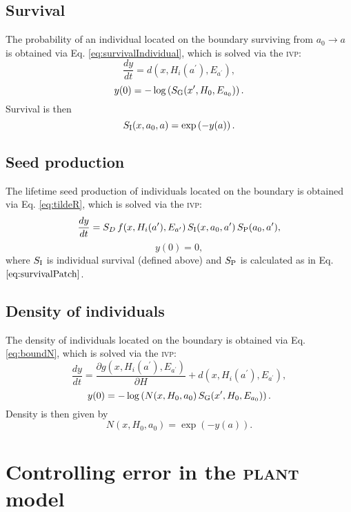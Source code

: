 \documentclass[10pt,twoside]{article}
\newcommand{\plant}{\textsc{plant}}
\begin{document}
\subsection{Survival}\label{survival}

The probability of an individual located on the boundary surviving from
\(a_0 \rightarrow a\) is obtained via Eq. \ref{eq:survivalIndividual},
which is solved via the \textsc{ivp}:
\[\frac{dy}{dt} = d(x, H_i(a^\prime) , E_{a^\prime}),\]
\[ y(0) = - \log\left(S_{\rm G} (x^\prime, H_0, E_{a_0})\right) .\]
Survival is then \[ S_{\rm I} (x, a_0, a) = \exp\left( - y(a) \right).\]

\subsection{Seed production}\label{seed-production}

The lifetime seed production of individuals located on the boundary is
obtained via Eq. \ref{eq:tildeR}, which is solved via the \textsc{ivp}:
\[\frac{dy}{dt} = S_D \, f(x, H_i(a^\prime), E_{a^\prime}) \, S_{\rm I} (x, a_0, a^\prime) \, S_{\rm P} (a_0, a^\prime),\]
\[ y(0) = 0,\] where \(S_{\rm I}\) is individual survival (defined
above) and \(S_{\rm P}\) is calculated as in Eq.
\(\ref{eq:survivalPatch}\).

\subsection{Density of individuals}\label{density-of-individuals}

The density of individuals located on the boundary is obtained via Eq.
\ref{eq:boundN}, which is solved via the \textsc{ivp}:
\[\frac{dy}{dt} = \frac{\partial g(x, H_i(a^\prime), E_{a^\prime})}{\partial H} + d(x, H_i(a^\prime), E_{a^\prime}),\]
\[ y(0) = - \log\left(N(x, H_0 , a_0) \, S_{\rm G} (x^\prime, H_0, E_{a_0}) \right).\]
Density is then given by \[N(x, H_0 , a_0) = \exp( - y(a)).\]

\section{Controlling error in the {\plant} model}
\label{controlling-error-in-the-plant-model}
\end{document}
